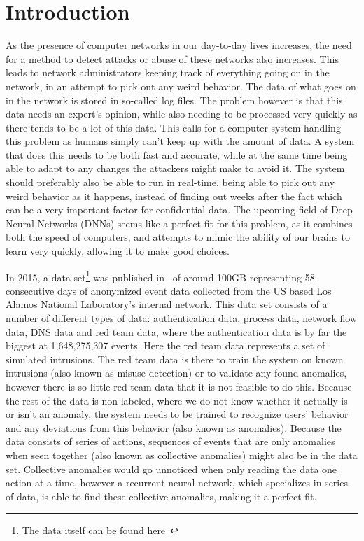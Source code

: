 \chapter{Introduction}\label{ch:introduction}
As the presence of computer networks in our day-to-day lives increases, the need for a method to detect attacks or abuse of these networks also increases. This leads to network administrators keeping track of everything going on in the network, in an attempt to pick out any weird behavior. The data of what goes on in the network is stored in so-called log files. The problem however is that this data needs an expert's opinion, while also needing to be processed very quickly as there tends to be a lot of this data. This calls for a computer system handling this problem as humans simply can't keep up with the amount of data. A system that does this needs to be both fast and accurate, while at the same time being able to adapt to any changes the attackers might make to avoid it. The system should preferably also be able to run in real-time, being able to pick out any weird behavior as it happens, instead of finding out weeks after the fact which can be a very important factor for confidential data. The upcoming field of Deep Neural Networks (DNNs) seems like a perfect fit for this problem, as it combines both the speed of computers, and attempts to mimic the ability of our brains to learn very quickly, allowing it to make good choices.

In 2015, a data set\footnote{The data itself can be found here~\cite{kent-2015-cyberdata1}} was published in~\cite{akent-2015-enterprise-data} of around 100GB representing 58 consecutive days of anonymized event data collected from the US based Los Alamos National Laboratory's internal network. This data set consists of a number of different types of data: authentication data, process data, network flow data, DNS data and red team data, where the authentication data is by far the biggest at 1,648,275,307 events. Here the red team data represents a set of simulated intrusions. The red team data is there to train the system on known intrusions (also known as misuse detection) or to validate any found anomalies, however there is so little red team data that it is not feasible to do this. Because the rest of the data is non-labeled, where we do not know whether it actually is or isn't an anomaly, the system needs to be trained to recognize users' behavior and any deviations from this behavior (also known as anomalies). Because the data consists of series of actions, sequences of events that are only anomalies when seen together (also known as collective anomalies) might also be in the data set. Collective anomalies would go unnoticed when only reading the data one action at a time, however a recurrent neural network, which specializes in series of data, is able to find these collective anomalies, making it a perfect fit.

